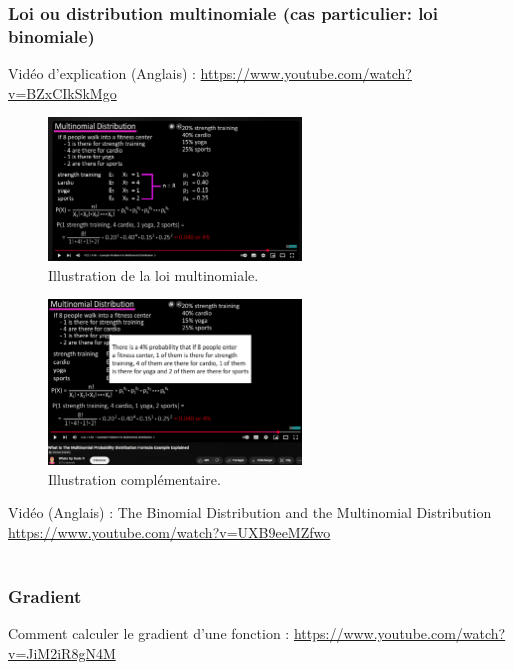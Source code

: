 \documentclass[12pt,a4paper]{article}
\begin{document}
	\subsubsection{Loi ou distribution multinomiale (cas particulier: loi binomiale)} %
	Vidéo d'explication (Anglais) : \url{https://www.youtube.com/watch?v=BZxCIkSkMgo}
	\begin{figure}[h!] %
		\centering
		\includegraphics[width=0.6\textwidth]{lawmutinominal.png} %
		\caption{Illustration de la loi multinomiale.}
		\label{fig:multinomial}
	\end{figure}
	
	\begin{figure}[h!]
		\centering
		\includegraphics[width=0.6\textwidth]{conclusion.png} %
		\caption{Illustration complémentaire.} %
		\label{fig:conclusion_img}
	\end{figure}
	
	Vidéo (Anglais) : The Binomial Distribution and the Multinomial Distribution \url{https://www.youtube.com/watch?v=UXB9eeMZfwo}
	\\
	\\
	\subsubsection{Gradient} %
	Comment calculer le gradient d'une fonction : \url{https://www.youtube.com/watch?v=JiM2iR8gN4M}
	
\end{document}
